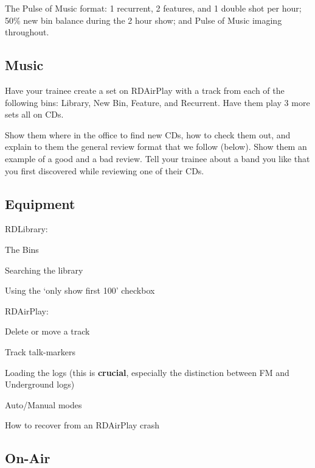 \documentclass[]{witrman}
\begin{document}
The Pulse of Music format: 1 recurrent, 2 features, and 1 double shot per hour;
50\% new bin balance during the 2 hour show; and Pulse of Music imaging
throughout.

\subsection{Music}

Have your trainee create a set on RDAirPlay with a track from each of the
following bins: Library, New Bin, Feature, and Recurrent.  Have them play 3 more
sets all on CDs.

Show them where in the office to find new CDs, how to check them out, and
explain to them the general review format that we follow (below).  Show them an
example of a good and a bad review.  Tell your trainee about a band you like
that you first discovered while reviewing one of their CDs.

\subsection{Equipment}

RDLibrary:
\vspace{-\topsep}
\begin{tightitemize}
    \item The Bins
    \item Searching the library
    \item Using the `only show first 100' checkbox
\end{tightitemize}

RDAirPlay:
\vspace{-\topsep}
\begin{tightitemize}
    \item Delete or move a track
    \item Track talk-markers
    \item Loading the logs (this is \textbf{crucial}, especially the distinction
        between FM and Underground logs)
    \item Auto/Manual modes
    \item How to recover from an RDAirPlay crash
\end{tightitemize}

\subsection{On-Air}
\end{document}
